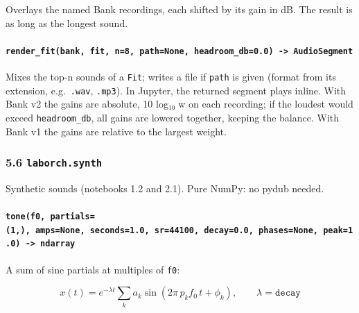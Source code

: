 \documentclass[
  10pt,
]{article}
\begin{document}
Overlays the named Bank recordings, each shifted by its gain
in dB. The result is as long as the longest sound.

\paragraph{\texorpdfstring{\texttt{render\_fit(bank,\ fit,\ n=8,\ path=None,\ headroom\_db=0.0)\ -\textgreater{}\ AudioSegment}}{render\_fit(bank, fit, n=8, path=None, headroom\_db=0.0) -\textgreater{} AudioSegment}}

Mixes the top-n sounds of a \texttt{Fit}; writes a file if
\texttt{path} is given (format from its extension,
e.g.~\texttt{.wav}, \texttt{.mp3}). In Jupyter, the returned
segment plays inline. With Bank v2 the gains are absolute,
10 log₁₀ w on each recording; if the loudest would exceed
\texttt{headroom\_db}, all gains are lowered together,
keeping the balance. With Bank v1 the gains are relative to
the largest weight.

\subsubsection{\texorpdfstring{5.6
\texttt{laborch.synth}}{5.6 laborch.synth}}

Synthetic sounds (notebooks 1.2 and 2.1). Pure NumPy: no
pydub needed.

\paragraph{\texorpdfstring{\texttt{tone(f0,\ partials=(1,),\ amps=None,\ seconds=1.0,\ sr=44100,\ decay=0.0,\ phases=None,\ peak=1.0)\ -\textgreater{}\ ndarray}}{tone(f0, partials=(1,), amps=None, seconds=1.0, sr=44100, decay=0.0, phases=None, peak=1.0) -\textgreater{} ndarray}}

A sum of sine partials at multiples of \texttt{f0}:

\[
  x(t) = e^{-\lambda t} \sum_k a_k \sin\!\left(2\pi\, p_k f_0\, t + \phi_k\right),
  \qquad \lambda = \texttt{decay}
\]
\end{document}
